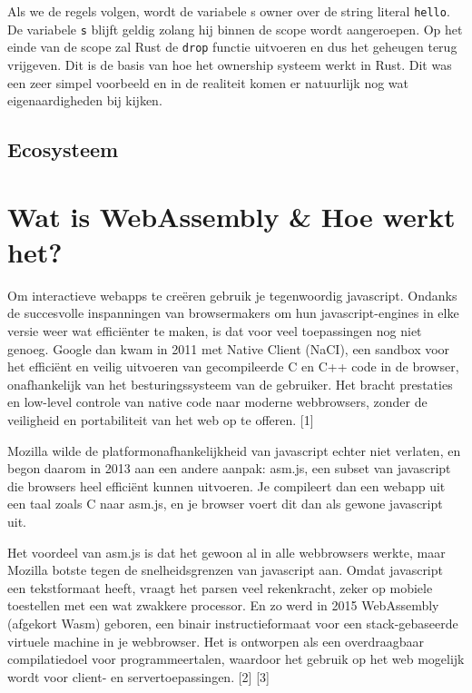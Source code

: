 Als we de regels volgen, wordt de variabele s owner over de string literal \texttt{hello}.
De variabele \texttt{s} blijft geldig zolang hij binnen de scope wordt aangeroepen. Op het
einde van de scope zal Rust de \texttt{drop} functie uitvoeren en dus het geheugen terug
vrijgeven. Dit is de basis van hoe het ownership systeem werkt in Rust. Dit was een zeer simpel
voorbeeld en in de realiteit komen er natuurlijk nog wat eigenaardigheden bij kijken.

\subsection{Ecosysteem}

\blindtext

\section{Wat is WebAssembly \& Hoe werkt het?}

Om interactieve webapps te creëren gebruik je tegenwoordig javascript. Ondanks de succesvolle
inspanningen van browsermakers om hun javascript-engines in elke versie weer wat efficiënter te
maken, is dat voor veel toepassingen nog niet genoeg. Google dan kwam in 2011 met Native Client
(NaCI), een sandbox voor het efficiënt en veilig uitvoeren van gecompileerde C en C++ code in de
browser, onafhankelijk van het besturingssysteem van de gebruiker. Het bracht prestaties en
low-level controle van native code naar moderne webbrowsers, zonder de veiligheid en portabiliteit
van het web op te offeren. [1] 

Mozilla wilde de platformonafhankelijkheid van javascript echter niet verlaten, en begon daarom in
2013 aan een andere aanpak: asm.js, een subset van javascript die browsers heel efficiënt kunnen
uitvoeren. Je compileert dan een webapp uit een taal zoals C naar asm.js, en je browser voert dit
dan als gewone javascript uit. 

Het voordeel van asm.js is dat het gewoon al in alle webbrowsers werkte, maar Mozilla botste tegen
de snelheidsgrenzen van javascript aan. Omdat javascript een tekstformaat heeft, vraagt het parsen
veel rekenkracht, zeker op mobiele toestellen met een wat zwakkere processor. En zo werd in 2015
WebAssembly (afgekort Wasm) geboren, een binair instructieformaat voor een stack-gebaseerde virtuele
machine in je webbrowser. Het is ontworpen als een overdraagbaar compilatiedoel voor
programmeertalen, waardoor het gebruik op het web mogelijk wordt voor client- en servertoepassingen.
[2] [3]

